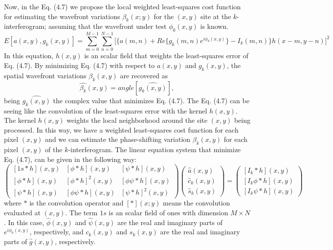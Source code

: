 Now, in the Eq. (4.7) we propose the local weighted least-squares cost function
for estimating the wavefront variations $\beta_k(x;y)$ for the $(x,y)$ site at
the $k$-interferogram; assuming that the wavefront under test $\phi_0(x,y)$ is
known.
\begin{equation}
E[a(x,y),g_{k}(x,y)]=\sum_{m=0}^{M-1}\sum_{n=0}^{N-1}\Bigg[\{a(m,n)+Re\{g_{k}(m,
n)e^ { i\phi_{0}(x,y)}\}-I_{k}(m,n)\}h(x-m,y-n)\Bigg]^{2}
\end{equation}
In this equation, $h(x,y)$ is an scalar field that weights the least-squares
error of Eq. (4.7). By minimizing Eq. (4.7) with respect to $a(x,y)$ and
$g_k(x,y)$, the spatial wavefront variations $\beta_k(x,y)$ are recovered as
\begin{equation}
 \hat{\beta_k}(x,y)=angle[\hat{g_k(x,y)}],
\end{equation}
being $\hat{g_k(x,y)}$ the complex value that minimizes Eq. (4.7). The Eq. (4.7)
can be seeing like the convolution of the least-squares error with the kernel
$h(x,y)$. The kernel $h(x,y)$ weights the local neighborhood around the site
$(x,y)$ being processed. In this way, we have a weighted least-squares cost
function for each pixel $(x,y)$ and we can estimate the phase-shifting variation
$\beta_k(x,y)$ for each pixel $(x,y)$ of the $k$-interferogram. The linear
equation system that minimize Eq. (4.7), can be given in the following way:
\begin{equation}
 \left(\begin{array}{ccc}
[1s*h](x,y) & [\phi*h](x,y) & [\psi*h](x,y)\\{}
[\phi*h](x,y) & [\phi*h]^{2}(x,y) & [\phi\psi*h](x,y)\\{}
[\psi*h](x,y) & [\phi\psi*h](x,y) & [\psi*h]^{2}(x,y)
\end{array}\right)\left(\begin{array}{c}
\hat{a}(x,y)\\
\hat{c}_{k}(x,y)\\
\hat{s}_{k}(x,y)
\end{array}\right)=\left(\begin{array}{c}
[I_{k}*h](x,y)\\{}
[I_{k}\phi*h](x,y)\\{}
[I_{k}\psi*h](x,y)
\end{array}\right)
\end{equation}
where $*$ is the convolution operator and $[*](x;y)$ means the convolution
evaluated at $(x,y)$. The term $1s$ is an scalar field of ones with dimension
$M \times N$. In this case, $\hat{\phi}(x,y)$ and $\hat{\psi}(x,y)$ are
the real and imaginary parts of $e^{i \phi_0(x,y)}$, respectively, and
$c_k(x,y)$ and $s_k(x,y)$ are the real and imaginary parts of $\hat{g}(x,y)$,
respectively.

